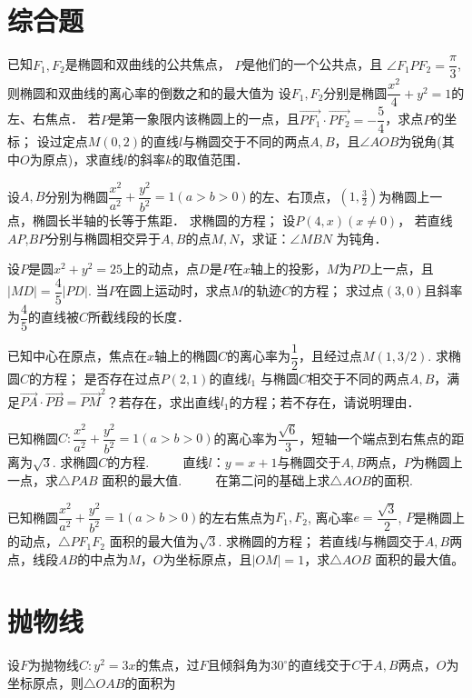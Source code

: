 \documentclass{article}
\begin{document}
\section{综合题}
    \question[2014湖北 ]已知$F_1,F_2$是椭圆和双曲线的公共焦点， $P$是他们的一个公共点，且 $\angle F_1PF_2=\dfrac{\pi}{3}$, 则椭圆和双曲线的离心率的倒数之和的最大值为
    \question 设$F_1,F_2$分别是椭圆$\dfrac{x^2}{4}+y^2=1$的左、右焦点．
        \quson 若$P$是第一象限内该椭圆上的一点，且$\overrightarrow{PF_1}\cdot \overrightarrow{PF_2}=-\dfrac{5}{4}$，求点$P$的坐标；
        \quson 设过定点$M(0,2)$的直线$l$与椭圆交于不同的两点$A,B$，且$\angle AOB$为锐角(其中$O$为原点)，求直线$l$的斜率$k$的取值范围．

    \question[作业]设$A,B$分别为椭圆$\dfrac{x^2}{a^2}+\dfrac{y^2}{b^2}=1(a>b>0)$的左、右顶点，$(1,\frac32)$为椭圆上一点，椭圆长半轴的长等于焦距．
        \quson 求椭圆的方程；
        \quson 设$P(4,x)(x\ne0)$， 若直线$AP$,$BP$分别与椭圆相交异于$A,B$的点$M,N$，求证：$\angle MBN $ 为钝角．

    \question[]设$P$是圆$x^2+y^2=25$上的动点，点$D$是$P$在$x$轴上的投影，$M$为$PD$上一点，且$|MD|=\dfrac45|PD|$.
        \quson 当$P$在圆上运动时，求点$M$的轨迹$C$的方程；
        \quson[(弦长公式)]求过点$(3,0)$且斜率为$\dfrac45$的直线被$C$所截线段的长度．

    \question 已知中心在原点，焦点在$x$轴上的椭圆$C$的离心率为$\dfrac12$，且经过点$M(1,3/2)$.
        \quson 求椭圆$C$的方程；
        \quson 是否存在过点$P(2,1)$的直线$l_1$ 与椭圆$C$相交于不同的两点$A,B$，满足$\overrightarrow{PA}\cdot\overrightarrow{PB}={\overrightarrow{PM}}^2$？若存在，求出直线$l_1$的方程；若不存在，请说明理由．

    \question 已知椭圆$C:\dfrac{x^2}{a^2}+\dfrac{y^2}{b^2}=1(a>b>0)$的离心率为$\dfrac{\sqrt6}{3}$，短轴一个端点到右焦点的距离为$\sqrt3$.
        \quson 求椭圆$C$的方程.
　　        \quson 直线$l：y=x+1$与椭圆交于$A,B$两点，$P$为椭圆上一点，求$\triangle PAB$ 面积的最大值.
　　        \quson 在第二问的基础上求$\triangle AOB$的面积.

    \question 已知椭圆$\dfrac{x^2}{a^2}+\dfrac{y^2}{b^2}=1(a>b>0)$的左右焦点为$F_1,F_2$, 离心率$e=\dfrac{\sqrt{3}}{2}$, $P$是椭圆上的动点，$\triangle PF_1F_2$ 面积的最大值为$\sqrt3$.
        \quson 求椭圆的方程；
        \quson 若直线$l$与椭圆交于$A,B$两点，线段$AB$的中点为$M$，$O$为坐标原点，且$|OM|=1$，求$\triangle AOB$ 面积的最大值。

\section{抛物线}
    设$F$为抛物线$C:y^2=3x$的焦点，过$F$且倾斜角为$30^{\circ}$的直线交于$C$于$A,B$两点，$O$为坐标原点，则$\triangle OAB$的面积为\brackets
 
\end{document}
